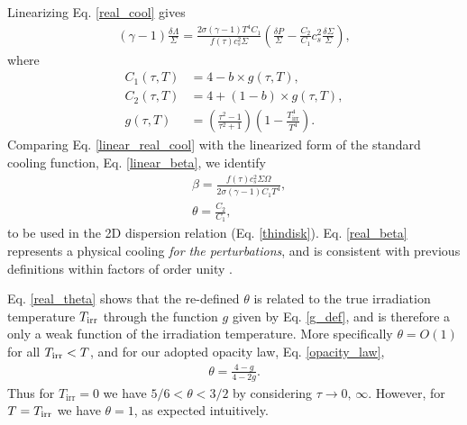 Linearizing Eq. \ref{real_cool} gives   
\begin{align}\label{linear_real_cool}
  (\gamma-1)\frac{\delta\Lambda}{\Sigma} = \frac{2\sigma(\gamma-1)
    T^4C_1}{f(\tau)c_{s}^2\Sigma}\left(\frac{\delta P}{\Sigma} -
  \frac{C_2}{C_1}c_{s}^2\frac{\delta\Sigma}{\Sigma}\right), 
\end{align}
where
\begin{align}
C_1(\tau, T) &= 4 - b\times g(\tau, T),\\ 
C_2(\tau, T) &= 4 + (1-b)\times g(\tau, T),\\ 
  g(\tau, T) &= \left( \frac{\tau^2-1}{\tau^2+1}\right)\left(1 -
  \frac{T_\mathrm{irr}^4}{T^4}\right). \label{g_def}
\end{align}
Comparing Eq. \ref{linear_real_cool} with the linearized form of the
standard cooling function, Eq. \ref{linear_beta}, we identify
\begin{align}
  &\beta = \frac{f(\tau)c_s^2\Sigma\Omega}{2\sigma(\gamma-1)C_1T^4},\label{real_beta}\\
  &\theta = \frac{C_2}{C_1},\label{real_theta} 
\end{align}
to be used in the 2D dispersion relation (Eq. \ref{thindisk}). 
Eq. \ref{real_beta} represents a physical cooling \emph{for the
  perturbations}, and is consistent with previous definitions within
factors of order unity \citep[e.g.][their Eq. 2]{kratter10}.  

Eq. \ref{real_theta} shows that the re-defined $\theta$ is related to
the true irradiation temperature $T_\mathrm{irr}$ through the function $g$ given by 
Eq. \ref{g_def}, and is therefore a only a weak function of the irradiation temperature. 
More specifically $\theta = O(1)$ 
for all $T_\mathrm{irr} <T$, and for our adopted opacity law, Eq. \ref{opacity_law}, 
\begin{align*}
  \theta = \frac{4-g}{4-2g}. 
\end{align*}
Thus for $T_\mathrm{irr} = 0$ we have $5/6<\theta<3/2$ by considering
$\tau\to 0,\,\infty$. However, for $T=T_\mathrm{irr}$ we have $\theta = 1$, as
expected intuitively.    

